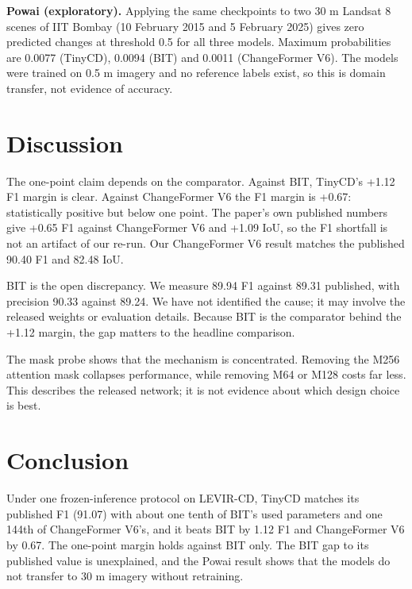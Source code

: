 \documentclass[conference]{IEEEtran}
\begin{document}
\textbf{Powai (exploratory).} Applying the same checkpoints to two 30 m Landsat 8 scenes of IIT Bombay (10 February 2015 and 5 February 2025) gives zero predicted changes at threshold 0.5 for all three models. Maximum probabilities are 0.0077 (TinyCD), 0.0094 (BIT) and 0.0011 (ChangeFormer V6). The models were trained on 0.5 m imagery and no reference labels exist, so this is domain transfer, not evidence of accuracy.

\section{Discussion}
The one-point claim depends on the comparator. Against BIT, TinyCD's +1.12 F1 margin is clear. Against ChangeFormer V6 the F1 margin is +0.67: statistically positive but below one point. The paper's own published numbers give +0.65 F1 against ChangeFormer V6 and +1.09 IoU, so the F1 shortfall is not an artifact of our re-run. Our ChangeFormer V6 result matches the published 90.40 F1 and 82.48 IoU.

BIT is the open discrepancy. We measure 89.94 F1 against 89.31 published, with precision 90.33 against 89.24. We have not identified the cause; it may involve the released weights or evaluation details. Because BIT is the comparator behind the +1.12 margin, the gap matters to the headline comparison.

The mask probe shows that the mechanism is concentrated. Removing the M256 attention mask collapses performance, while removing M64 or M128 costs far less. This describes the released network; it is not evidence about which design choice is best.

\section{Conclusion}
Under one frozen-inference protocol on LEVIR-CD, TinyCD matches its published F1 (91.07) with about one tenth of BIT's used parameters and one 144th of ChangeFormer V6's, and it beats BIT by 1.12 F1 and ChangeFormer V6 by 0.67. The one-point margin holds against BIT only. The BIT gap to its published value is unexplained, and the Powai result shows that the models do not transfer to 30 m imagery without retraining.



\end{document}
